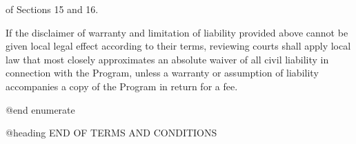 \itemInterpretation of Sections 15 and 16.

If the disclaimer of warranty and limitation of liability provided
above cannot be given local legal effect according to their terms,
reviewing courts shall apply local law that most closely approximates
an absolute waiver of all civil liability in connection with the
Program, unless a warranty or assumption of liability accompanies a
copy of the Program in return for a fee.

@end enumerate

@heading END OF TERMS AND CONDITIONS


